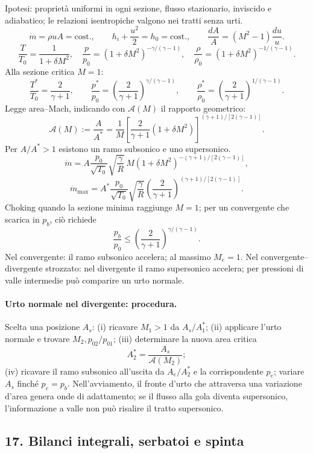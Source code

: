 \documentclass[11pt,a4paper]{article}
\begin{document}
Ipotesi: proprietà uniformi in ogni sezione, flusso stazionario, inviscido e adiabatico;
le relazioni isentropiche valgono nei tratti senza urti.
\[
\dot m=\rho uA=\text{cost.},\qquad
h_i+\frac{u^2}{2}=h_0=\text{cost.},\qquad
\frac{dA}{A}=(M^2-1)\frac{du}{u}.
\]
\[
\frac{T}{T_0}=\frac1{1+\delta M^2},\quad
\frac p{p_0}=(1+\delta M^2)^{-\gamma/(\gamma-1)},\quad
\frac\rho{\rho_0}=(1+\delta M^2)^{-1/(\gamma-1)}.
\]
Alla sezione critica $M=1$:
\[
\frac{T^*}{T_0}=\frac{2}{\gamma+1},\qquad
\frac{p^*}{p_0}=\left(\frac{2}{\gamma+1}\right)^{\gamma/(\gamma-1)},\qquad
\frac{\rho^*}{\rho_0}=\left(\frac{2}{\gamma+1}\right)^{1/(\gamma-1)}.
\]
Legge area--Mach, indicando con $\mathcal{A}(M)$ il rapporto geometrico:
\[
\mathcal{A}(M):=\frac A{A^*}=\frac1M
\left[\frac{2}{\gamma+1}(1+\delta M^2)\right]^{(\gamma+1)/[2(\gamma-1)]}.
\]
Per $A/A^*>1$ esistono un ramo subsonico e uno supersonico.
\[
\dot m=A\frac{p_0}{\sqrt{T_0}}\sqrt{\frac\gamma R}\,
M(1+\delta M^2)^{-(\gamma+1)/[2(\gamma-1)]},
\]
\[
\dot m_{\max}=A^*\frac{p_0}{\sqrt{T_0}}\sqrt{\frac\gamma R}
\left(\frac{2}{\gamma+1}\right)^{(\gamma+1)/[2(\gamma-1)]}.
\]
Choking quando la sezione minima raggiunge $M=1$; per un convergente che scarica in
$p_b$, ciò richiede
\[
\frac{p_b}{p_0}\le\left(\frac{2}{\gamma+1}\right)^{\gamma/(\gamma-1)}.
\]
Nel convergente: il ramo subsonico accelera; al massimo $M_e=1$. Nel convergente--
divergente strozzato: nel divergente il ramo supersonico accelera; per pressioni di valle
intermedie può comparire un urto normale.

\paragraph*{Urto normale nel divergente: procedura.}
Scelta una posizione $A_s$: (i) ricavare $M_1>1$ da $A_s/A_1^*$; (ii) applicare l'urto
normale e trovare $M_2,p_{02}/p_{01}$; (iii) determinare la nuova area critica
\[
A_2^*=\frac{A_s}{\mathcal{A}(M_2)};
\]
(iv) ricavare il ramo subsonico all'uscita da $A_e/A_2^*$ e la corrispondente $p_e$;
variare $A_s$ finché $p_e=p_b$. Nell'avviamento, il fronte d'urto che attraversa una
variazione d'area genera onde di adattamento; se il flusso alla gola diventa supersonico,
l'informazione a valle non può risalire il tratto supersonico.

\subsection*{17. Bilanci integrali, serbatoi e spinta}
\end{document}
